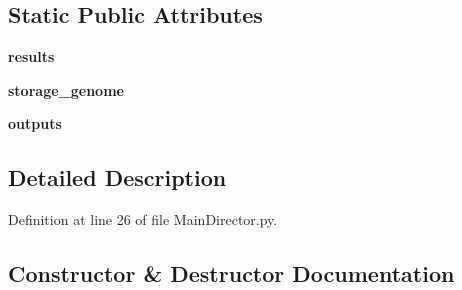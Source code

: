\subsection*{Static Public Attributes}
\begin{DoxyCompactItemize}
\item 
{\bfseries results}\hypertarget{class_n_e_a_t___py_genetics_1_1_n_e_a_t_1_1_director_1_1_main_director_1_1_main_director_acd18b971efa2d58d414e1aedcafb065d}{}\label{class_n_e_a_t___py_genetics_1_1_n_e_a_t_1_1_director_1_1_main_director_1_1_main_director_acd18b971efa2d58d414e1aedcafb065d}

\item 
{\bfseries storage\+\_\+genome}\hypertarget{class_n_e_a_t___py_genetics_1_1_n_e_a_t_1_1_director_1_1_main_director_1_1_main_director_ac579f78b49d7a2711bf925459dd1266d}{}\label{class_n_e_a_t___py_genetics_1_1_n_e_a_t_1_1_director_1_1_main_director_1_1_main_director_ac579f78b49d7a2711bf925459dd1266d}

\item 
{\bfseries outputs}\hypertarget{class_n_e_a_t___py_genetics_1_1_n_e_a_t_1_1_director_1_1_main_director_1_1_main_director_ab3116c3ed89cc021eb261dc9f3913cd2}{}\label{class_n_e_a_t___py_genetics_1_1_n_e_a_t_1_1_director_1_1_main_director_1_1_main_director_ab3116c3ed89cc021eb261dc9f3913cd2}

\end{DoxyCompactItemize}


\subsection{Detailed Description}


Definition at line 26 of file Main\+Director.\+py.



\subsection{Constructor \& Destructor Documentation}
